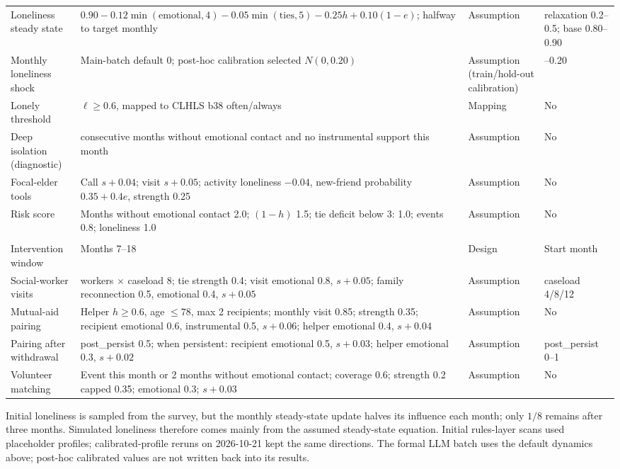 \documentclass[10pt,twocolumn]{article}
\begin{document}
\begin{table}[t]
\begin{tabular}{@{}>{\raggedright\arraybackslash}p{}>{\raggedright\arraybackslash}p{}>{\raggedright\arraybackslash}p{}>{\raggedright\arraybackslash}p{}@{}}
Loneliness steady state & $0.90-0.12\min(\text{emotional},4)-0.05\min(\text{ties},5)-0.25h+0.10(1-e)$; halfway to target monthly & Assumption & relaxation 0.2--0.5; base 0.80--0.90 \\
Monthly loneliness shock & Main-batch default 0; post-hoc calibration selected $N(0,0.20)$ & Assumption (train/hold-out calibration) & 0--0.20 \\
Lonely threshold & $\ell\ge0.6$, mapped to CLHLS b38 often/always & Mapping & No \\
Deep isolation (diagnostic) & 3 consecutive months without emotional contact and no instrumental support this month & Assumption & No \\
Focal-elder tools & Call $s{+}0.04$; visit $s{+}0.05$; activity loneliness $-0.04$, new-friend probability $0.35+0.4e$, strength 0.25 & Assumption & No \\
Risk score & Months without emotional contact 2.0; $(1-h)$ 1.5; tie deficit below 3: 1.0; events 0.8; loneliness 1.0 & Assumption & No \\
\midrule
\multicolumn{4}{@{}l}{\textit{Interventions (direction from literature; numerical values are modelling choices)}} \\
Intervention window & Months 7--18 & Design & Start month \\
Social-worker visits & 2 workers $\times$ caseload 8; tie strength 0.4; visit emotional 0.8, $s{+}0.05$; family reconnection 0.5, emotional 0.4, $s{+}0.05$ & Assumption & caseload 4/8/12 \\
Mutual-aid pairing & Helper $h\ge0.6$, age $\le78$, max 2 recipients; monthly visit 0.85; strength 0.35; recipient emotional 0.6, instrumental 0.5, $s{+}0.06$; helper emotional 0.4, $s{+}0.04$ & Assumption & No \\
Pairing after withdrawal & post\_persist 0.5; when persistent: recipient emotional 0.5, $s{+}0.03$; helper emotional 0.3, $s{+}0.02$ & Assumption & post\_persist 0--1 \\
Volunteer matching & Event this month or 2 months without emotional contact; coverage 0.6; strength 0.2 capped 0.35; emotional 0.3; $s{+}0.03$ & Assumption & No \\
\bottomrule
\end{tabular}
\smallskip

{\footnotesize Initial loneliness is sampled from the survey, but the monthly steady-state update halves its influence each month; only $1/8$ remains after three months. Simulated loneliness therefore comes mainly from the assumed steady-state equation. Initial rules-layer scans used placeholder profiles; calibrated-profile reruns on 2026-10-21 kept the same directions. The formal LLM batch uses the default dynamics above; post-hoc calibrated values are not written back into its results.}
\end{table}
\end{document}
